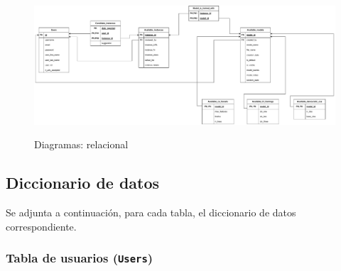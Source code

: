 \begin{landscape}
	\begin{figure}[h]
		\caption{Diagramas: relacional}
		\centering
		\includegraphics[scale=0.46]{../img/anexos/diagrams/relational}
		\label{c:diagrama-relacional}
	\end{figure}
\end{landscape}

\subsection{Diccionario de datos}

Se adjunta a continuación, para cada tabla, el diccionario de datos correspondiente. \label{c:diccionario_datos}

\subsubsection{Tabla de usuarios (\texttt{Users})}

